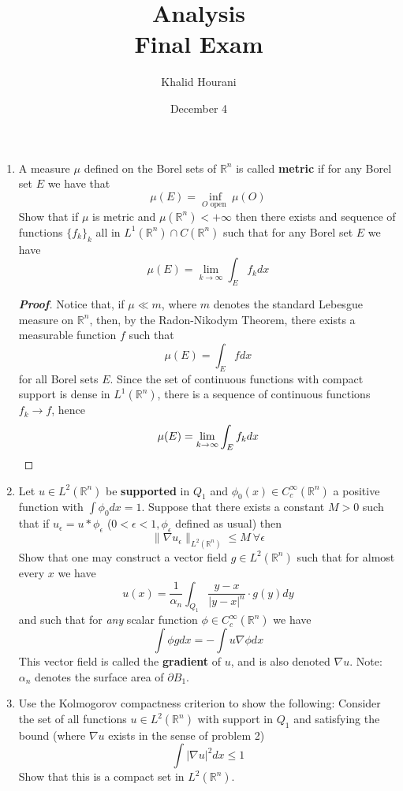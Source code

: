 \documentclass[12pt,leqno]{book}
\title{Analysis\\Final Exam}
\date{December 4}
\author{Khalid Hourani}
\theoremstyle{definition}
\newcommand{\R}{\mathbb{R}}
\newenvironment{Proof}{\begin{proof}[\textnormal{\textbf{Proof}}]}{\end{proof}}
\begin{document}
\begin{titlepage}
 \maketitle\thispagestyle{empty}
\end{titlepage}
\thispagestyle{empty}
\clearpage\mbox{}\clearpage

\setcounter{page}{1}
\begin{enumerate}
 \item A measure $\mu$ defined on the Borel sets of $\R^n$ is called \textbf{metric} if for any Borel set $E$ we have that \[\mu(E)=\inf_{O\text{ open }}\mu(O)\] Show that if $\mu$ is metric and $\mu(\R^n)<+\infty$ then there exists and sequence of functions $\{f_k\}_k$ all in $L^1(\R^n)\cap C(\R^n)$ such that for any Borel set $E$ we have \[\mu(E)=\lim_{k\to\infty}\int_Ef_kdx\] 

\begin{Proof}
 Notice that, if $\mu\ll m$, where $m$ denotes the standard Lebesgue measure on $\R^n$, then, by the Radon-Nikodym Theorem, there exists a measurable function $f$ such that \[\mu(E)=\int_Efdx\] for all Borel sets $E$. Since the set of continuous functions with compact support is dense in $L^1(\R^n)$, there is a sequence of continuous functions $f_k\to f$, hence \[\mu(E)=\lim_{k\to\infty}\int_Ef_kdx\qedhere\] 
\end{Proof}

 \item Let $u\in L^2(\R^n)$ be \textbf{supported} in $Q_1$ and $\phi_0(x)\in C_c^{\infty}(\R^n)$ a positive function with $\int\phi_0dx=1$. Suppose that there exists a constant $M>0$ such that if $u_{\epsilon}=u*\phi_{\epsilon}$ ($0<\epsilon<1,\phi_{\epsilon}$ defined as usual) then \[\|\nabla u_{\epsilon}\|_{L^2(\R^n)}\leq M\:\forall\epsilon\] Show that one may construct a vector field $g\in L^2(\R^n)$ such that for almost every $x$ we have \[u(x)=\frac{1}{\alpha_n}\int_{Q_1}\frac{y-x}{|y-x|^n}\cdot g(y)dy\] and such that for \textit{any} scalar function $\phi\in C_c^{\infty}(\R^n)$ we have \[\int\phi gdx=-\int u\nabla\phi dx\] This vector field is called the \textbf{gradient} of $u$, and is also denoted $\nabla u$. Note: $\alpha_n$ denotes the surface area of $\partial B_1$.

 \item Use the Kolmogorov compactness criterion to show the following: Consider the set of all functions $u\in L^2(\R^n)$ with support in $Q_1$ and satisfying the bound (where $\nabla u$ exists in the sense of problem 2)\[\int|\nabla u|^2dx\leq1\] Show that this is a compact set in $L^2(\R^n)$.


\end{enumerate}
\end{document}
